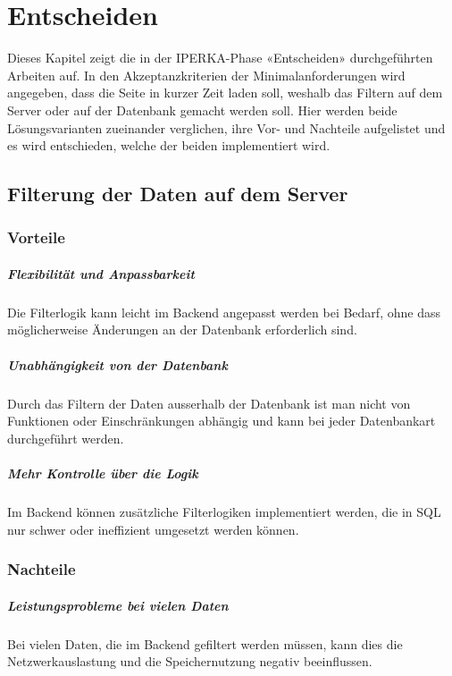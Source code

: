 \chapter{Entscheiden}\label{ch:entscheiden}
Dieses Kapitel zeigt die in der IPERKA-Phase «Entscheiden» durchgeführten Arbeiten auf. In den Akzeptanzkriterien der Minimalanforderungen wird angegeben, dass die Seite in kurzer Zeit laden soll, weshalb das Filtern auf dem Server oder auf der Datenbank gemacht werden soll. Hier werden beide Lösungsvarianten zueinander verglichen, ihre Vor- und Nachteile aufgelistet und es wird entschieden, welche der beiden implementiert wird.

\section{Filterung der Daten auf dem Server}

\subsection{Vorteile}
\paragraph{Flexibilität und Anpassbarkeit} Die Filterlogik kann leicht im Backend angepasst werden bei Bedarf, ohne dass möglicherweise Änderungen an der Datenbank erforderlich sind.
\paragraph{Unabhängigkeit von der Datenbank} Durch das Filtern der Daten ausserhalb der Datenbank ist man nicht von Funktionen oder Einschränkungen abhängig und kann bei jeder Datenbankart durchgeführt werden.
\paragraph{Mehr Kontrolle über die Logik} Im Backend können zusätzliche Filterlogiken implementiert werden, die in SQL nur schwer oder ineffizient umgesetzt werden können.

\subsection{Nachteile}
\paragraph{Leistungsprobleme bei vielen Daten} Bei vielen Daten, die im Backend gefiltert werden müssen, kann dies die Netzwerkauslastung und die Speichernutzung negativ beeinflussen.
